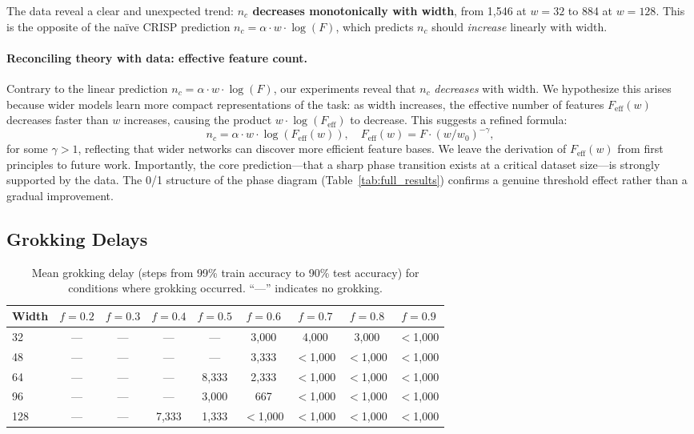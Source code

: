 \documentclass{article}
\newcommand{\nc}{n_c}
\newcommand{\Fnum}{F}
\begin{document}
The data reveal a clear and unexpected trend: \textbf{$\nc$ decreases monotonically with width}, from 1{,}546 at $w = 32$ to 884 at $w = 128$.
This is the opposite of the na\"ive CRISP prediction $\nc = \alpha \cdot w \cdot \log(\Fnum)$, which predicts $\nc$ should \emph{increase} linearly with width.

\paragraph{Reconciling theory with data: effective feature count.}
Contrary to the linear prediction $\nc = \alpha \cdot w \cdot \log(\Fnum)$, our experiments reveal that $\nc$ \emph{decreases} with width.
We hypothesize this arises because wider models learn more compact representations of the task: as width increases, the effective number of features $F_{\text{eff}}(w)$ decreases faster than $w$ increases, causing the product $w \cdot \log(F_{\text{eff}})$ to decrease.
This suggests a refined formula:
\begin{equation}
\label{eq:nc_refined}
\nc = \alpha \cdot w \cdot \log(F_{\text{eff}}(w)), \quad F_{\text{eff}}(w) = \Fnum \cdot (w / w_0)^{-\gamma},
\end{equation}
for some $\gamma > 1$, reflecting that wider networks can discover more efficient feature bases.
We leave the derivation of $F_{\text{eff}}(w)$ from first principles to future work.
Importantly, the core prediction---that a sharp phase transition exists at a critical dataset size---is strongly supported by the data.
The 0/1 structure of the phase diagram (Table~\ref{tab:full_results}) confirms a genuine threshold effect rather than a gradual improvement.

\subsection{Grokking Delays}

\begin{table}[t]
\centering
\caption{Mean grokking delay (steps from 99\% train accuracy to 90\% test accuracy) for conditions where grokking occurred. ``---'' indicates no grokking.}
\label{tab:delays}
\vspace{0.5em}
\begin{tabular}{@{}lcccccccc@{}}
\toprule
\textbf{Width} & $f{=}0.2$ & $f{=}0.3$ & $f{=}0.4$ & $f{=}0.5$ & $f{=}0.6$ & $f{=}0.7$ & $f{=}0.8$ & $f{=}0.9$ \\
\midrule
32  & --- & --- & --- & --- & 3{,}000 & 4{,}000 & 3{,}000 & $<$1{,}000 \\
48  & --- & --- & --- & --- & 3{,}333 & $<$1{,}000 & $<$1{,}000 & $<$1{,}000 \\
64  & --- & --- & --- & 8{,}333 & 2{,}333 & $<$1{,}000 & $<$1{,}000 & $<$1{,}000 \\
96  & --- & --- & --- & 3{,}000 & 667 & $<$1{,}000 & $<$1{,}000 & $<$1{,}000 \\
128 & --- & --- & 7{,}333 & 1{,}333 & $<$1{,}000 & $<$1{,}000 & $<$1{,}000 & $<$1{,}000 \\
\bottomrule
\end{tabular}
\end{table}
\end{document}
